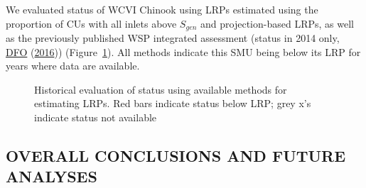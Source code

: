 \documentclass[11pt]{book}
\begin{document}
We evaluated status of WCVI Chinook using LRPs estimated using the proportion of CUs with all inlets above \(S_{gen}\) and projection-based LRPs, as well as the previously published WSP integrated assessment (status in 2014 only, \protect\hyperlink{ref-dfoIntegratedBiologicalStatus2016}{DFO} (\protect\hyperlink{ref-dfoIntegratedBiologicalStatus2016}{2016})) (Figure~\ref{fig:chinook-retro}). All methods indicate this SMU being below its LRP for years where data are available.
\begin{figure}[htb]

{\centering {} 

}

\caption{Historical evaluation of status using available methods for estimating LRPs. Red bars indicate status below LRP; grey x's indicate status not available}\label{fig:chinook-retro}
\end{figure}
\hypertarget{overall-conclusions-and-future-analyses}{%
\subsection{OVERALL CONCLUSIONS AND FUTURE ANALYSES}\label{overall-conclusions-and-future-analyses}}
\end{document}
